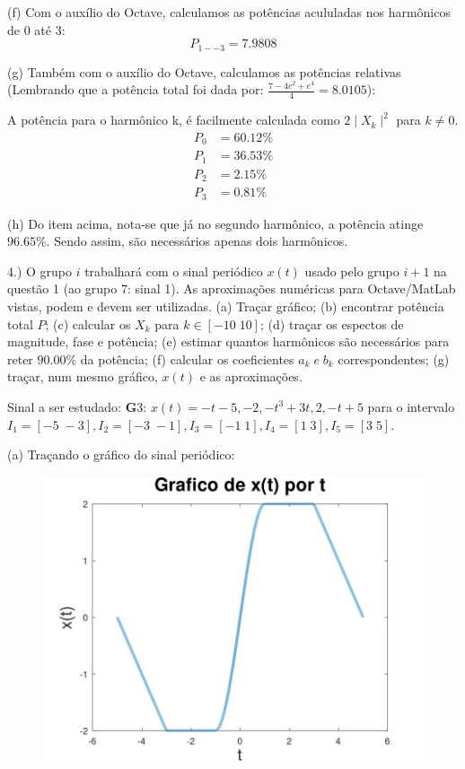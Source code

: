 \documentclass{article}
\begin{document}
\vspace{\baselineskip}

(f) Com o auxílio do Octave, calculamos as potências acululadas nos harmônicos de 0 até 3:
\[P_{1--3} = 7.9808\]

\vspace{\baselineskip}

(g) Também com o auxílio do Octave, calculamos as potências relativas (Lembrando que a potência total foi dada por: $\frac{7 - 4e^{2} + e^4}{4} = 8.0105$):

A potência para o harmônico k, é facilmente calculada como $2\mid X_{k} \mid^{2}$ para $k \neq 0$.
\begin{align*}
    P_{0} &= 60.12\%\\
    P_{1} &= 36.53\%\\
    P_{2} &= 2.15\%\\
    P_{3} &= 0.81\%
\end{align*}

(h) Do item acima, nota-se que já no segundo harmônico, a potência atinge $96.65\%$. Sendo assim, são necessários apenas dois harmônicos.

\vspace{\baselineskip}

4.) O grupo $i$ trabalhará com o sinal periódico $x(t)$ usado pelo grupo $i + 1$ na questão 1 (ao grupo 7: sinal 1). As aproximações numéricas para Octave/MatLab vistas, podem e devem ser utilizadas.
(a) Traçar gráfico;
(b) encontrar potência total $P$;
(c) calcular os $X_{k}$ para $k \in [-10\;10]$;
(d) traçar os espectos de magnitude, fase e potência;
(e) estimar quantos harmônicos são necessários para reter $90.00\%$ da potência;
(f) calcular os coeficientes $a_{k}\;e\;b_{k}$ correspondentes;
(g) traçar, num mesmo gráfico, $x(t)$ e as aproximações.

Sinal a ser estudado: {\textbf G3}: $x(t) = -t - 5, -2, -t^3 + 3t, 2, -t + 5$ para o intervalo $I_{1} = [-5\;-3], I_{2} = [-3\;-1], I_{3} = [-1\;1], I_{4} = [1\;3], I_{5} = [3\;5]$.

(a) Traçando o gráfico do sinal periódico:

\begin{figure}[!ht]
    \includegraphics[scale=0.2]{plot4a}
    \centering
\end{figure}
\end{document}
